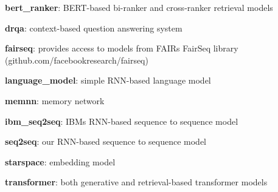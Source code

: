 \begin{DoxyItemize}
\item {\bfseries bert\+\_\+ranker}\+: B\+E\+R\+T-\/based bi-\/ranker and cross-\/ranker retrieval models
\item {\bfseries drqa}\+: context-\/based question answering system
\item {\bfseries fairseq}\+: provides access to models from F\+A\+IR\textquotesingle{}s Fair\+Seq library (github.\+com/facebookresearch/fairseq)
\item {\bfseries language\+\_\+model}\+: simple R\+N\+N-\/based language model
\item {\bfseries memnn}\+: memory network
\item {\bfseries ibm\+\_\+seq2seq}\+: I\+BM\textquotesingle{}s R\+N\+N-\/based sequence to sequence model
\item {\bfseries seq2seq}\+: our R\+N\+N-\/based sequence to sequence model
\item {\bfseries starspace}\+: embedding model
\item {\bfseries transformer}\+: both generative and retrieval-\/based transformer models 
\end{DoxyItemize}